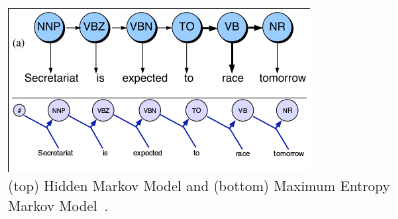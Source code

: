 \begin{figure}[ht]
\centering
\includegraphics[width=80mm]{figures/memm.png}
\caption{(top) Hidden Markov Model and (bottom) Maximum Entropy Markov Model~\cite{nlpBook}. \label{hmmVmemm}}
\end{figure}
